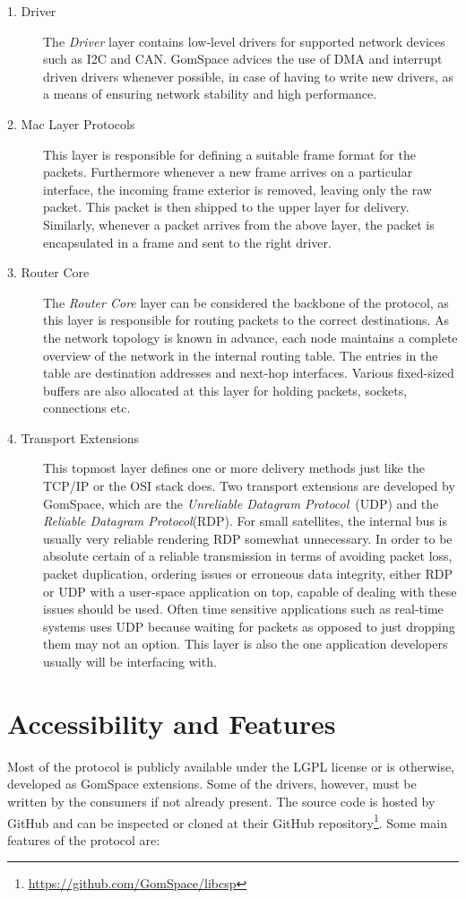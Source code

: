\begin{description}
	\item[1. Driver] The \textit{Driver} layer contains low-level drivers for supported network devices such as I2C and CAN. GomSpace advices the use of DMA and interrupt driven drivers whenever possible, in case of having to write new drivers, as a means of ensuring network stability and high performance.
	\item[2. Mac Layer Protocols] This layer is responsible for defining a suitable frame format for the packets. Furthermore whenever a new frame arrives on a particular interface, the incoming frame exterior is removed, leaving only the raw packet. This packet is then shipped to the upper layer for delivery. Similarly, whenever a packet arrives from the above layer, the packet is encapsulated in a frame and sent to the right driver.
	\item[3. Router Core] The \textit{Router Core} layer can be considered the backbone of the protocol, as this layer is responsible for routing packets to the correct destinations. As the network topology is known in advance, each node maintains a complete overview of the network in the internal routing table. The entries in the table are destination addresses and next-hop interfaces. Various fixed-sized buffers are also allocated at this layer for holding packets, sockets, connections etc.
	\item[4. Transport Extensions] This topmost layer defines one or more delivery methods just like the TCP/IP or the OSI stack does. Two transport extensions are developed by GomSpace, which are the \textit{Unreliable Datagram Protocol}~(UDP) and the \textit{Reliable Datagram Protocol}(RDP). For small satellites, the internal bus is usually very reliable rendering RDP somewhat unnecessary. In order to be absolute certain of a reliable transmission in terms of avoiding packet loss, packet duplication, ordering issues or erroneous data integrity, either RDP or UDP with a user-space application on top, capable of dealing with these issues should be used. Often time sensitive applications such as real-time systems uses UDP because waiting for packets as opposed to just dropping them may not an option. This layer is also the one application developers usually will be interfacing with.

\end{description}
  
\section{Accessibility and Features}
Most of the protocol is publicly available under the LGPL license or is otherwise, developed as GomSpace extensions. Some of the drivers, however, must be written by the consumers if not already present. The source code is hosted by GitHub and can be inspected or cloned at their GitHub repository\footnote{\url{https://github.com/GomSpace/libcsp}}. Some main features of the protocol are:


